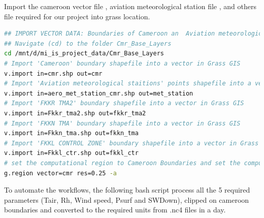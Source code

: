 Import the cameroon vector file , aviation meteorological station file , and others file required for our project into grass location. 
\begin{lstlisting}[language=Bash]
## IMPORT VECTOR DATA: Boundaries of Cameroon an  Aviation meteorological station in cameroon
## Navigate (cd) to the folder Cmr_Base_Layers
cd /mnt/d/mi_is_project_data/Cmr_Base_Layers 
# Import 'Cameroon' boundary shapefile into a vector in Grass GIS
v.import in=cmr.shp out=cmr
# Import 'Aviation meteorological staitions' points shapefile into a vector in Grass GIS
v.import in=aero_met_station_cmr.shp out=met_station
# Import 'FKKR TMA2' boundary shapefile into a vector in Grass GIS
v.import in=Fkkr_tma2.shp out=fkkr_tma2
# Import 'FKKN TMA' boundary shapefile into a vector in Grass GIS
v.import in=Fkkn_tma.shp out=fkkn_tma
# Import 'FKKL CONTROL ZONE' boundary shapefile into a vector in Grass GIS
v.import in=Fkkl_ctr.shp out=fkkl_ctr
# set the computational region to Cameroon Boundaries and set the computational resolution to 0.25 degrees
g.region vector=cmr res=0.25 -a
\end{lstlisting}
To automate the workflows, the following bash script process all the 5 required parameters (Tair, Rh, Wind speed, Psurf and SWDown), clipped on cameroon boundaries  and converted to the required units from .nc4 files in a day.
